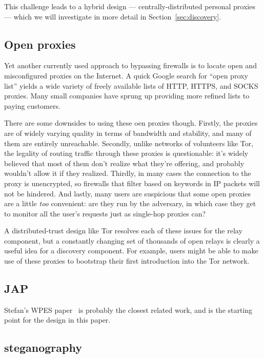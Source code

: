 \documentclass{llncs}
\begin{document}
This challenge leads to a hybrid design --- centrally-distributed
personal proxies --- which we will investigate in more detail in
Section~\ref{sec:discovery}.

\subsection{Open proxies}

Yet another currently used approach to bypassing firewalls is to locate
open and misconfigured proxies on the Internet. A quick Google search
for ``open proxy list'' yields a wide variety of freely available lists
of HTTP, HTTPS, and SOCKS proxies. Many small companies have sprung up
providing more refined lists to paying customers.

There are some downsides to using these oen proxies though. Firstly,
the proxies are of widely varying quality in terms of bandwidth and
stability, and many of them are entirely unreachable. Secondly, unlike
networks of volunteers like Tor, the legality of routing traffic through
these proxies is questionable: it's widely believed that most of them
don't realize what they're offering, and probably wouldn't allow it if
they realized. Thirdly, in many cases the connection to the proxy is
unencrypted, so firewalls that filter based on keywords in IP packets
will not be hindered. And lastly, many users are suspicious that some
open proxies are a little \emph{too} convenient: are they run by the
adversary, in which case they get to monitor all the user's requests
just as single-hop proxies can?

A distributed-trust design like Tor resolves each of these issues for
the relay component, but a constantly changing set of thousands of open
relays is clearly a useful idea for a discovery component. For example,
users might be able to make use of these proxies to bootstrap their
first introduction into the Tor network.

\subsection{JAP}

Stefan's WPES paper~\cite{koepsell:wpes2004} is probably the closest
related work, and is
the starting point for the design in this paper.

\subsection{steganography}
\end{document}
